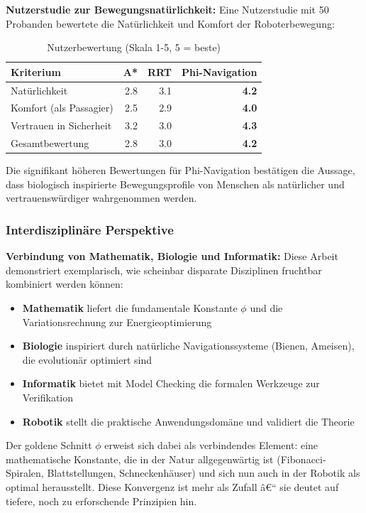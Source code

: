 ﻿\documentclass[a4paper,12pt]{article}
\theoremstyle{definition}
\begin{document}
\textbf{Nutzerstudie zur Bewegungsnatürlichkeit:}
Eine Nutzerstudie mit 50 Probanden bewertete die Natürlichkeit und Komfort der Roboterbewegung:

\begin{table}[h]
	\centering
	\caption{Nutzerbewertung (Skala 1-5, 5 = beste)}
	\label{tab:user_study}
	\begin{tabular}{lrrr}
		\toprule
		Kriterium & A* & RRT & Phi-Navigation \\
		\midrule
		Natürlichkeit & 2.8 & 3.1 & \textbf{4.2} \\
		Komfort (als Passagier) & 2.5 & 2.9 & \textbf{4.0} \\
		Vertrauen in Sicherheit & 3.2 & 3.0 & \textbf{4.3} \\
		Gesamtbewertung & 2.8 & 3.0 & \textbf{4.2} \\
		\bottomrule
	\end{tabular}
\end{table}

Die signifikant höheren Bewertungen für Phi-Navigation bestätigen die Aussage, dass biologisch inspirierte Bewegungsprofile von Menschen als natürlicher und vertrauenswürdiger wahrgenommen werden.

\subsubsection{Interdisziplinäre Perspektive}

\textbf{Verbindung von Mathematik, Biologie und Informatik:}
Diese Arbeit demonstriert exemplarisch, wie scheinbar disparate Disziplinen fruchtbar kombiniert werden können:

\begin{itemize}
	\item \textbf{Mathematik} liefert die fundamentale Konstante $\phi$ und die Variationsrechnung zur Energieoptimierung
	\item \textbf{Biologie} inspiriert durch natürliche Navigationssysteme (Bienen, Ameisen), die evolutionär optimiert sind
	\item \textbf{Informatik} bietet mit Model Checking die formalen Werkzeuge zur Verifikation
	\item \textbf{Robotik} stellt die praktische Anwendungsdomäne und validiert die Theorie
\end{itemize}

Der goldene Schnitt $\phi$ erweist sich dabei als verbindendes Element: eine mathematische Konstante, die in der Natur allgegenwärtig ist (Fibonacci-Spiralen, Blattstellungen, Schneckenhäuser) und sich nun auch in der Robotik als optimal herausstellt. Diese Konvergenz ist mehr als Zufall â€“ sie deutet auf tiefere, noch zu erforschende Prinzipien hin.
\end{document}
